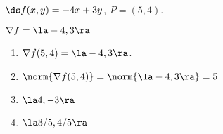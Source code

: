 {$\ds f(x,y) = -4x+3y$, $P = (5,4)$.
}
{$\nabla f = \la -4,3\ra$
\begin{enumerate}
	\item  $\nabla f(5,4) = \la -4,3\ra$.
	\item		$\norm{\nabla f(5,4)} = \norm{\la -4,3\ra}=5$
	\item		$\la 4,-3\ra$
	\item		$\la 3/5,4/5\ra$
\end{enumerate}
}